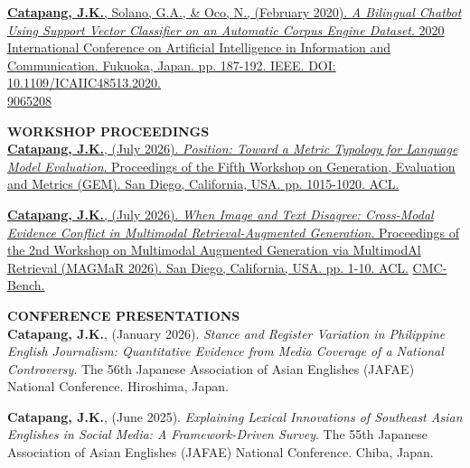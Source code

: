 \documentclass[margin]{res}
\begin{document}
\begin{resume}
\vspace{-12pt}

 \href{https://ieeexplore.ieee.org/document/9065208}{\textbf{Catapang, J.K.}, Solano, G.A., \& Oco, N., (February 2020). \textit{A Bilingual Chatbot Using Support Vector Classifier on an Automatic Corpus Engine Dataset}. 2020 International Conference on Artificial Intelligence in Information and Communication. Fukuoka, Japan. pp. 187-192. IEEE. DOI: 10.1109/ICAIIC48513.2020.\\9065208}

\textbf{WORKSHOP PROCEEDINGS}\\
 \href{https://aclanthology.org/2026.gem-main.78/}{\textbf{Catapang, J.K.}, (July 2026). \textit{Position: Toward a Metric Typology for Language Model Evaluation}. Proceedings of the Fifth Workshop on Generation, Evaluation and Metrics (GEM). San Diego, California, USA. pp. 1015-1020. ACL.}

\vspace{-12pt}

 \href{https://aclanthology.org/2026.magmar-main.3/}{\textbf{Catapang, J.K.}, (July 2026). \textit{When Image and Text Disagree: Cross-Modal Evidence Conflict in Multimodal Retrieval-Augmented Generation}. Proceedings of the 2nd Workshop on Multimodal Augmented Generation via MultimodAl Retrieval (MAGMaR 2026). San Diego, California, USA. pp. 1-10. ACL.} \href{https://github.com/jaspercatapang/cmc-bench}{CMC-Bench.}

\textbf{CONFERENCE PRESENTATIONS}\\
 \textbf{Catapang, J.K.}, (January 2026). \textit{Stance and Register Variation in Philippine English Journalism: Quantitative Evidence from Media Coverage of a National Controversy}. The 56th Japanese Association of Asian Englishes (JAFAE) National Conference. Hiroshima, Japan.

\vspace{-12pt}

 \textbf{Catapang, J.K.}, (June 2025). \textit{Explaining Lexical Innovations of Southeast Asian Englishes in Social Media: A Framework-Driven Survey}. The 55th Japanese Association of Asian Englishes (JAFAE) National Conference. Chiba, Japan.


\end{resume}
\end{document}
